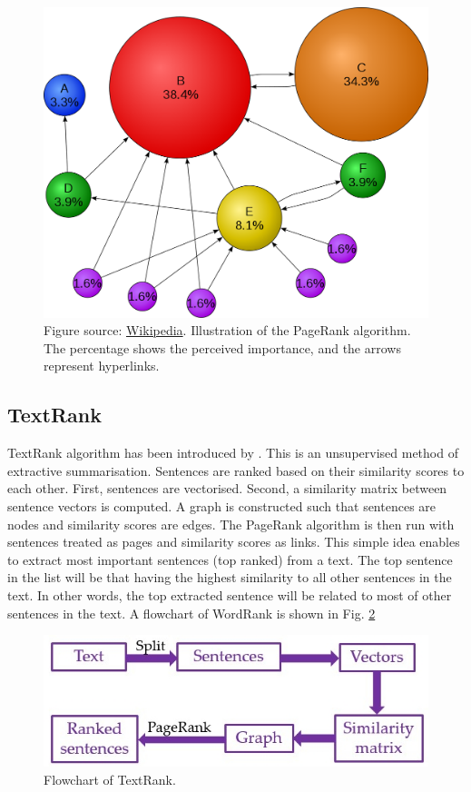 \documentclass[11pt]{article}
\begin{document}
\begin{figure}[!h]
\centering
\includegraphics[scale = 0.175]{../figures/PR.png}
\caption{Figure source: \href{https://en.wikipedia.org/wiki/File:PageRanks-Example.svg}{Wikipedia}. Illustration of the PageRank algorithm. The percentage shows the perceived importance, and the arrows represent hyperlinks.\label{fig:PR}}
\end{figure}

\subsection{TextRank}
\label{subsect:textrank}

TextRank algorithm has been introduced by \citet{mihalcea2004textrank}. This is an unsupervised method of extractive summarisation. Sentences are ranked based on their similarity scores to each other. First, sentences are vectorised. Second, a similarity matrix between sentence vectors is computed. A graph is constructed such that sentences are nodes and similarity scores are edges. The PageRank algorithm is then run with sentences treated as pages and similarity scores as links. This simple idea enables to extract most important sentences (top ranked) from a text. The top sentence in the list will be that having the highest similarity to all other sentences in the text. In other words, the top extracted sentence will be related to most of other sentences in the text. A flowchart of WordRank is shown in Fig. \ref{fig:textrank}

\begin{figure}[!h]
\centering
\includegraphics[scale = 0.5]{../figures/textrank.jpg}
\caption{Flowchart of TextRank.\label{fig:textrank}}
\end{figure}
\end{document}
